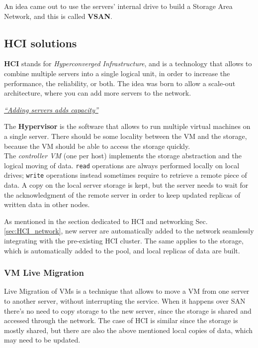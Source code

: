 An idea came out to use the servers' internal drive to build a Storage Area Network, and this is called \textbf{VSAN}.

\subsection{HCI solutions}
\textbf{HCI} stands for \textit{Hyperconverged Infrastructure}, and is a technology that allows to combine multiple servers into a single logical unit, in order to increase the performance, the reliability, or both. 
The idea was born to allow a scale-out architecture, where you can add more servers to the network.

\begin{center}
   \ul{\textit{``Adding servers adds capacity''}}
\end{center}

The \textbf{Hypervisor} is the software that allows to run multiple virtual machines on a single server. There should be some locality between the VM and the storage, because the VM should be able to access the storage quickly.\\
The \textit{controller VM} (one per host) implements the storage abstraction and the logical moving of data.
\texttt{read} operations are always performed locally on local drives; \texttt{write} operations instead sometimes require to retrieve a remote piece of data.
A copy on the local server storage is kept, but the server needs to wait for the acknowledgment of the remote server in order to keep updated replicas of written data in other nodes.

As mentioned in the section dedicated to HCI and networking Sec. \ref{sec:HCI_network}, new server are automatically added to the network seamlessly integrating with the pre-existing HCI cluster.
The same applies to the storage, which is automatically added to the pool, and local replicas of data are built.

\subsubsection{VM Live Migration}
Live Migration of VMs is a technique that allows to move a VM from one server to another server, without interrupting the service. 
When it happens over SAN there's no need to copy storage to the new server, since the storage is shared and accessed through the network.
The case of HCI is similar since the storage is mostly shared, but there are also the above mentioned local copies of data, which may need to be updated. 

